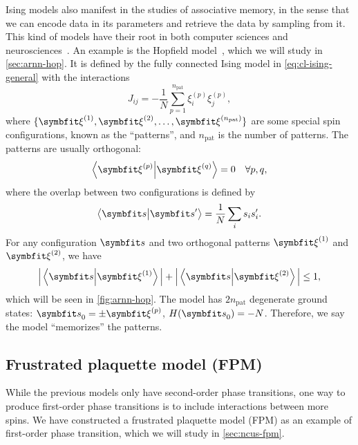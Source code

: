 Ising models also manifest in the studies of associative memory, in the sense that we can encode data in its parameters and retrieve the data by sampling from it. This kind of models have their root in both computer sciences and neurosciences~\cite{carpenter1989neural}. An example is the Hopfield model~\cite{hopfield1982neural, amit1985spin}, which we will study in \cref{sec:arnn-hop}. It is defined by the fully connected Ising model in \cref{eq:cl-ising-general} with the interactions
\begin{equation}
J_{i j} = -\frac{1}{N} \sum_{p = 1}^{n_\text{pat}} \xi^{(p)}_i \xi^{(p)}_j,
\label{eq:hopfield}
\end{equation}
where $\{\vxi^{(1)}, \vxi^{(2)}, \ldots, \vxi^{(n_\text{pat})}\}$ are some special spin configurations, known as the ``patterns'', and $n_\text{pat}$ is the number of patterns. The patterns are usually orthogonal:
\begin{equation}
\ip{\vxi^{(p)}}{\vxi^{(q)}} = 0 \quad \forall p, q,
\label{eq:cl-ortho}
\end{equation}
where the overlap between two configurations is defined by
\begin{equation}
\ip{\vs}{\vs'} = \frac{1}{N} \sum_i s_i s'_i.
\label{eq:cl-overlap}
\end{equation}
For any configuration $\vs$ and two orthogonal patterns $\vxi^{(1)}$ and $\vxi^{(2)}$, we have
\begin{equation}
\Big| \ip{\vs}{\vxi^{(1)}} \Big| + \Big| \ip{\vs}{\vxi^{(2)}} \Big| \le 1,
\end{equation}
which will be seen in \cref{fig:arnn-hop}. The model has $2 n_\text{pat}$ degenerate ground states: $\vs_0 = \pm \vxi^{(p)}$, $H(\vs_0) = -N$. Therefore, we say the model ``memorizes'' the patterns.

\subsection{Frustrated plaquette model (FPM)}
\label{sec:fpm}

While the previous models only have second-order phase transitions, one way to produce first-order phase transitions is to include interactions between more spins. We have constructed a frustrated plaquette model (FPM) as an example of first-order phase transition, which we will study in \cref{sec:ncus-fpm}.

